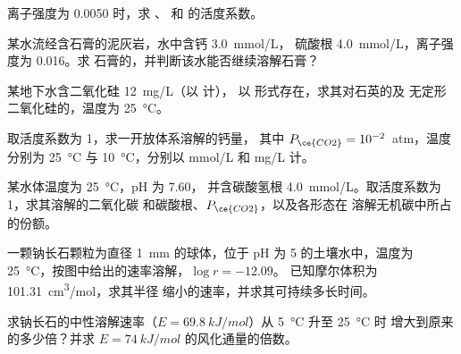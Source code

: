 \begin{exercise}[$\star$]\label{exo:b3:water-rock-interaction:2}
离子强度为 0.0050 时，求
、 和  的活度系数。
\end{exercise}

\begin{exercise}[$\star$]\label{exo:b3:water-rock-interaction:3}
某水流经含石膏的泥灰岩，水中含钙 \qty{3.0}{mmol/L}，
硫酸根 \qty{4.0}{mmol/L}，离子强度为 0.016。求
石膏的，并判断该水能否继续溶解石膏？
\end{exercise}

\begin{exercise}[$\star$]\label{exo:b3:water-rock-interaction:4}
某地下水含二氧化硅 \qty{12}{mg/L}（以  计），
以  形式存在，求其对石英的及
无定形二氧化硅的，温度为 \qty{25}{\celsius}。
\end{exercise}

\begin{exercise}[$\star\star$]\label{exo:b3:water-rock-interaction:5}
取活度系数为 1，求一开放体系溶解的钙量，
其中 $P_{\ce{CO2}} = 10^{-2}$~atm，温度分别为 \qty{25}{\celsius} 与
\qty{10}{\celsius}，分别以 \unit{mmol/L} 和 \unit{mg/L} 计。
\end{exercise}

\begin{exercise}[$\star\star$]\label{exo:b3:water-rock-interaction:6}
某水体温度为 \qty{25}{\celsius}，pH 为 7.60，
并含碳酸氢根 \qty{4.0}{mmol/L}。取活度系数为 1，求其溶解的二氧化碳
和碳酸根、$P_{\ce{CO2}}$，以及各形态在
溶解无机碳中所占的份额。
\end{exercise}

\begin{exercise}[$\star\star$]\label{exo:b3:water-rock-interaction:7}
一颗钠长石颗粒为直径 \qty{1}{mm} 的球体，位于 pH 为 5 的土壤水中，温度为
\qty{25}{\celsius}，按图中给出的速率溶解，$\log r = -12.09$。
已知摩尔体积为 \qty{101.31}{cm^3/mol}，求其半径
缩小的速率，并求其可持续多长时间。
\end{exercise}

\begin{exercise}[$\star\star$]\label{exo:b3:water-rock-interaction:8}
求钠长石的中性溶解速率（$E =
\qty{69.8}{kJ/mol}$）从 \qty{5}{\celsius} 升至 \qty{25}{\celsius} 时
增大到原来的多少倍？并求 $E = \qty{74}{kJ/mol}$ 的风化通量的倍数。
\end{exercise}

